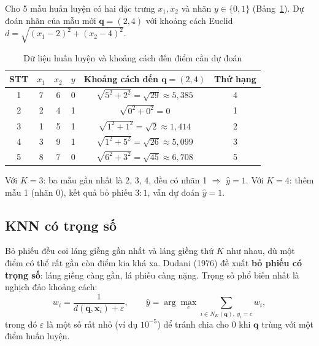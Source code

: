 \begin{example}
Cho 5 mẫu huấn luyện có hai đặc trưng $x_1, x_2$ và nhãn $y \in \{0, 1\}$ (Bảng~\ref{tab:knn-class}). Dự đoán nhãn của mẫu mới $\mathbf{q} = (2, 4)$ với khoảng cách Euclid $d = \sqrt{(x_1 - 2)^2 + (x_2 - 4)^2}$.
\end{example}

\begin{table}[H]
\centering
\begin{tabular}{|c|c|c|c|c|c|}
\hline
\textbf{STT} & $x_1$ & $x_2$ & $y$ & \textbf{Khoảng cách đến $\mathbf{q} = (2, 4)$} & \textbf{Thứ hạng} \\
\hline
1 & 7 & 6 & 0 & $\sqrt{5^2 + 2^2} = \sqrt{29} \approx 5{,}385$ & 4 \\ \hline
2 & 2 & 4 & 1 & $\sqrt{0^2 + 0^2} = 0$ & 1 \\ \hline
3 & 1 & 5 & 1 & $\sqrt{1^2 + 1^2} = \sqrt{2} \approx 1{,}414$ & 2 \\ \hline
4 & 3 & 9 & 1 & $\sqrt{1^2 + 5^2} = \sqrt{26} \approx 5{,}099$ & 3 \\ \hline
5 & 8 & 7 & 0 & $\sqrt{6^2 + 3^2} = \sqrt{45} \approx 6{,}708$ & 5 \\ \hline
\end{tabular}
\caption{Dữ liệu huấn luyện và khoảng cách đến điểm cần dự đoán}
\label{tab:knn-class}
\end{table}

Với $K = 3$: ba mẫu gần nhất là 2, 3, 4, đều có nhãn 1 $\Rightarrow$ $\hat{y} = 1$. Với $K = 4$: thêm mẫu 1 (nhãn 0), kết quả bỏ phiếu $3 : 1$, vẫn dự đoán $\hat{y} = 1$.

\subsection{KNN có trọng số}

Bỏ phiếu đều coi láng giềng gần nhất và láng giềng thứ $K$ như nhau, dù một điểm có thể rất gần còn điểm kia khá xa. Dudani (1976) đề xuất \textbf{bỏ phiếu có trọng số}: láng giềng càng gần, lá phiếu càng nặng. Trọng số phổ biến nhất là nghịch đảo khoảng cách:
\begin{equation}
    w_i = \frac{1}{d(\mathbf{q}, \mathbf{x}_i) + \varepsilon}, \qquad
    \hat{y} = \arg\max_{c} \sum_{i \in N_K(\mathbf{q}),\ y_i = c} w_i,
\end{equation}
trong đó $\varepsilon$ là một số rất nhỏ (ví dụ $10^{-5}$) để tránh chia cho 0 khi $\mathbf{q}$ trùng với một điểm huấn luyện.

